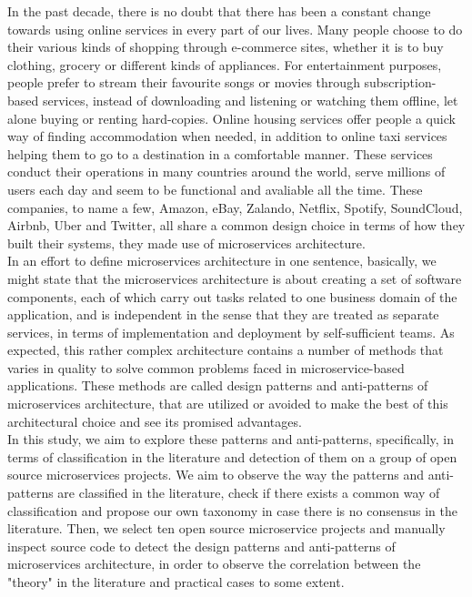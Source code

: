 \documentclass{Configuration_Files/PoliMi3i_thesis}
\begin{document}
In the past decade, there is no doubt that there has been a constant change towards using online services in every part of our lives.
Many people choose to do their various kinds of shopping through e-commerce sites, whether it is to buy clothing, grocery or different kinds of appliances.
For entertainment purposes, people prefer to stream their favourite songs or movies through subscription-based services, instead of downloading and listening or watching them offline, let alone buying or renting hard-copies.
Online housing services offer people a quick way of finding accommodation when needed, in addition to online taxi services helping them to go to a destination in a comfortable manner.
These services conduct their operations in many countries around the world, serve millions of users each day and seem to be functional and avaliable all the time.
These companies, to name a few, Amazon, eBay, Zalando, Netflix, Spotify, SoundCloud, Airbnb, Uber and Twitter, all share a common design choice in terms of how they built their systems, they made use of microservices architecture.
\\
In an effort to define microservices architecture in one sentence, basically, we might state that the microservices architecture is about creating a set of software components, each of which carry out tasks related to one business domain of the application, and is independent in the sense that they are treated as separate services, in terms of implementation and deployment by self-sufficient teams.
As expected, this rather complex architecture contains a number of methods that varies in quality to solve common problems faced in microservice-based applications.
These methods are called design patterns and anti-patterns of microservices architecture, that are utilized or avoided to make the best of this architectural choice and see its promised advantages.
\\
In this study, we aim to explore these patterns and anti-patterns, specifically, in terms of classification in the literature and detection of them on a group of open source microservices projects.
We aim to observe the way the patterns and anti-patterns are classified in the literature, check if there exists a common way of classification and propose our own taxonomy in case there is no consensus in the literature.
Then, we select ten open source microservice projects and manually inspect source code to detect the design patterns and anti-patterns of microservices architecture, in order to observe the correlation between the "theory" in the literature and practical cases to some extent.
\end{document}
